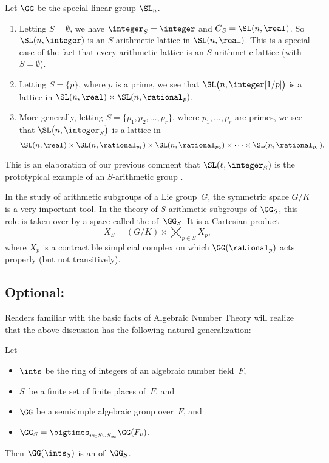 \begin{eg}
Let $\GG$ be the special linear group $\SL_n$.
\noprelistbreak
	\begin{enumerate}
	\item Letting $S = \emptyset$, we have $\integer_S = \integer$ and $G_S = \SL(n,\real)$. So $\SL(n,\integer)$ is an $S$-arithmetic lattice in $\SL(n,\real)$. This is a special case of the fact that every arithmetic lattice is an $S$-arithmetic lattice (with $S = \emptyset$).
	\item Letting $S = \{p\}$, where $p$ is a prime, we see that $\SL \bigl( n, \integer[1/p] \bigr)$ is a lattice in $\SL(n,\real) \times \SL(n,\rational_p)$.
	\item More generally, letting $S =  \{p_1,p_2,\ldots,p_r\}$, where $p_1,\ldots,p_r$ are primes, we see that $\SL \bigl( n, \integer_S \bigr)$ is a lattice in 
		$$\SL(n,\real) \times \SL(n,\rational_{p_1}) \times \SL(n,\rational_{p_2}) \times \cdots  \times \SL(n,\rational_{p_r}) .$$
	\end{enumerate}
This is an elaboration of our previous comment that $\SL(\ell, \integer_S)$ is the prototypical example of an $S$-arithmetic group .
\end{eg}

\begin{rem}
In the study of arithmetic subgroups of a Lie group~$G$, the symmetric space $G/K$ is a very important tool.
In the theory of $S$-arithmetic subgroups of $\GG_S$, this role is taken over by a space called the  of~$\GG_S$.
It is a Cartesian product
	$$ X_S = (G/K) \times \bigtimes_{p \in S} X_p , $$
where $X_p$ is a contractible simplicial complex on which $\GG(\rational_p)$ acts properly (but not transitively).
\end{rem}


\subsection*{Optional:}
Readers familiar with the basic facts of Algebraic Number Theory will realize that the above discussion has the following natural generalization:

\begin{defn}
\label{SarithFDefn} 
Let
\noprelistbreak
	\begin{itemize}
	\item $\ints$ be the ring of integers of an algebraic number field~$F$, 
	\item $S$~be a finite set of finite places of~$F$, 
	and
	\item $\GG$ be a semisimple algebraic group over~$F$,
	and
	\item $\GG_S = \bigtimes_{v \in S \cup S_\infty} \GG(F_v)$.
	\end{itemize}
Then $\GG(\ints_S)$ is an  of~$\GG_S$.
\end{defn}

